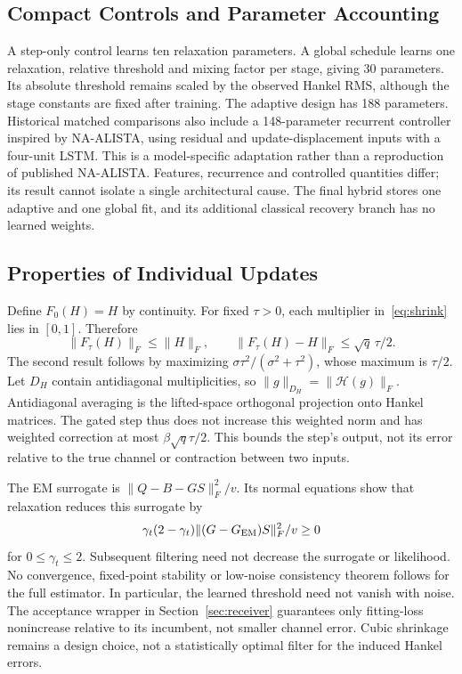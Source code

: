 \documentclass[10pt,journal,letterpaper]{IEEEtran}
\newcommand{\HH}{\mathcal{H}}
\begin{document}
\subsection{Compact Controls and Parameter Accounting}
A step-only control learns ten relaxation parameters. A global schedule learns one relaxation, relative threshold and mixing factor per stage, giving 30 parameters. Its absolute threshold remains scaled by the observed Hankel RMS, although the stage constants are fixed after training. The adaptive design has 188 parameters. Historical matched comparisons also include a 148-parameter recurrent controller inspired by NA-ALISTA, using residual and update-displacement inputs with a four-unit LSTM. This is a model-specific adaptation rather than a reproduction of published NA-ALISTA. Features, recurrence and controlled quantities differ; its result cannot isolate a single architectural cause. The final hybrid stores one adaptive and one global fit, and its additional classical recovery branch has no learned weights.

\subsection{Properties of Individual Updates}
Define $F_0(H)=H$ by continuity. For fixed $\tau>0$, each multiplier in~\eqref{eq:shrink} lies in $[0,1]$. Therefore
\begin{equation}
 \|F_\tau(H)\|_F\le\|H\|_F,\qquad
 \|F_\tau(H)-H\|_F\le\sqrt q\,\tau/2.
 \label{eq:bound}
\end{equation}
The second result follows by maximizing $\sigma\tau^2/(\sigma^2+\tau^2)$, whose maximum is $\tau/2$. Let $D_H$ contain antidiagonal multiplicities, so $\|g\|_{D_H}=\|\HH(g)\|_F$. Antidiagonal averaging is the lifted-space orthogonal projection onto Hankel matrices. The gated step thus does not increase this weighted norm and has weighted correction at most $\beta\sqrt q\tau/2$. This bounds the step's output, not its error relative to the true channel or contraction between two inputs.

The EM surrogate is $\|Q-B-GS\|_F^2/v$. Its normal equations show that relaxation reduces this surrogate by
\begin{equation}
 \gamma_t(2-\gamma_t)\|(G-G_{\rm EM})S\|_F^2/v\ge0
\end{equation}
for $0\le\gamma_t\le2$. Subsequent filtering need not decrease the surrogate or likelihood. No convergence, fixed-point stability or low-noise consistency theorem follows for the full estimator. In particular, the learned threshold need not vanish with noise. The acceptance wrapper in Section~\ref{sec:receiver} guarantees only fitting-loss nonincrease relative to its incumbent, not smaller channel error. Cubic shrinkage remains a design choice, not a statistically optimal filter for the induced Hankel errors.
\end{document}
